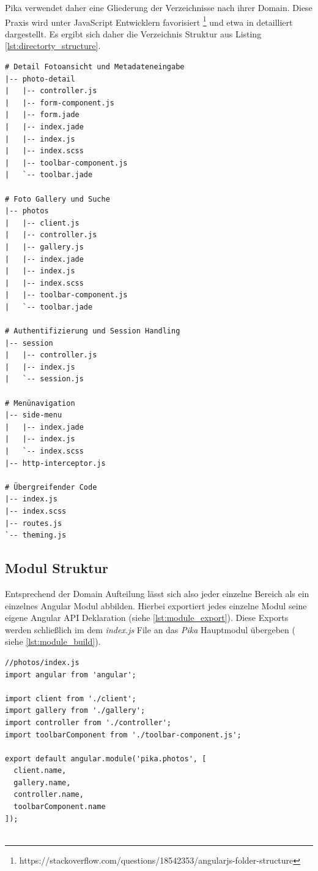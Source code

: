 Pika verwendet daher eine Gliederung der Verzeichnisse nach ihrer Domain. Diese Praxis wird unter JavaScript Entwicklern favorisiert \footnote{https://stackoverflow.com/questions/18542353/angularjs-folder-structure} und etwa in \cite{Kukic:2014} detailliert dargestellt. Es ergibt sich daher die Verzeichnis Struktur aus Listing \ref{lst:directorty_structure}.


\begin{listing}[H]
\begin{verbatim}
# Detail Fotoansicht und Metadateneingabe 
|-- photo-detail 
|   |-- controller.js
|   |-- form-component.js
|   |-- form.jade
|   |-- index.jade
|   |-- index.js
|   |-- index.scss
|   |-- toolbar-component.js
|   `-- toolbar.jade

# Foto Gallery und Suche
|-- photos
|   |-- client.js
|   |-- controller.js
|   |-- gallery.js
|   |-- index.jade
|   |-- index.js
|   |-- index.scss
|   |-- toolbar-component.js
|   `-- toolbar.jade

# Authentifizierung und Session Handling
|-- session
|   |-- controller.js
|   |-- index.js
|   `-- session.js

# Menünavigation
|-- side-menu
|   |-- index.jade
|   |-- index.js
|   `-- index.scss
|-- http-interceptor.js

# Übergreifender Code
|-- index.js
|-- index.scss
|-- routes.js
`-- theming.js
\end{verbatim}
\caption{Directory Structure}
\label{lst:directorty_structure}
\end{listing}

\subsection{Modul Struktur}

Entsprechend der Domain Aufteilung lässt sich also jeder einzelne Bereich als ein einzelnes Angular Modul abbilden. Hierbei exportiert jedes einzelne Modul seine eigene Angular API Deklaration (siehe \ref{lst:module_export}). Diese Exports werden schließlich im dem \textit{index.js} File an das \textit{Pika} Hauptmodul übergeben ( siehe \ref{lst:module_build}).


\begin{listing}[H]
\begin{verbatim}
//photos/index.js
import angular from 'angular';

import client from './client';
import gallery from './gallery';
import controller from './controller';
import toolbarComponent from './toolbar-component.js';

export default angular.module('pika.photos', [
  client.name,
  gallery.name,
  controller.name,
  toolbarComponent.name
]);
 
\end{verbatim}
\caption{Modul Export}
\label{lst:module_export}
\end{listing}


